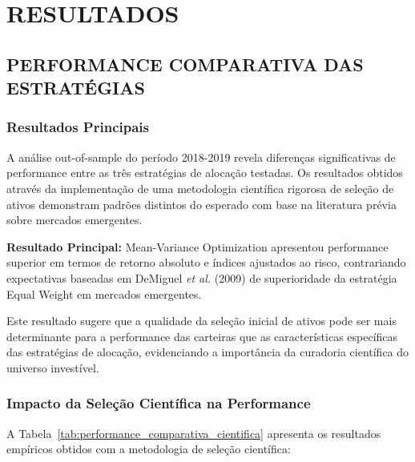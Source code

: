 
\chapter{RESULTADOS}

\section{PERFORMANCE COMPARATIVA DAS ESTRATÉGIAS}

\subsection{Resultados Principais}

A análise out-of-sample do período 2018-2019 revela diferenças significativas de performance entre as três estratégias de alocação testadas. Os resultados obtidos através da implementação de uma metodologia científica rigorosa de seleção de ativos demonstram padrões distintos do esperado com base na literatura prévia sobre mercados emergentes.

\textbf{Resultado Principal:} Mean-Variance Optimization apresentou performance superior em termos de retorno absoluto e índices ajustados ao risco, contrariando expectativas baseadas em DeMiguel \textit{et al.} (2009) de superioridade da estratégia Equal Weight em mercados emergentes.

Este resultado sugere que a qualidade da seleção inicial de ativos pode ser mais determinante para a performance das carteiras que as características específicas das estratégias de alocação, evidenciando a importância da curadoria científica do universo investível.

\subsection{Impacto da Seleção Científica na Performance}

A Tabela~\ref{tab:performance_comparativa_cientifica} apresenta os resultados empíricos obtidos com a metodologia de seleção científica:

